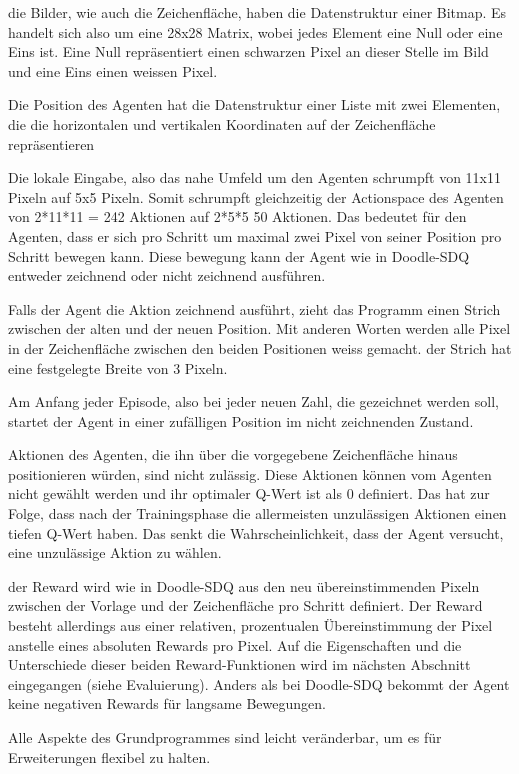 die Bilder, wie auch die Zeichenfläche, haben die Datenstruktur einer Bitmap. Es
handelt sich also um eine 28x28 Matrix, wobei jedes Element eine Null oder eine
Eins ist. Eine Null repräsentiert einen schwarzen Pixel an dieser Stelle im Bild
und eine Eins einen weissen Pixel.

Die Position des Agenten hat die Datenstruktur einer Liste mit zwei Elementen,
die die horizontalen und vertikalen Koordinaten auf der Zeichenfläche
repräsentieren

Die lokale Eingabe, also das nahe Umfeld um den Agenten schrumpft von 11x11
Pixeln auf 5x5 Pixeln. Somit schrumpft gleichzeitig der Actionspace des Agenten
von 2*11*11 = 242 Aktionen auf 2*5*5 50 Aktionen. Das bedeutet für den Agenten,
dass er sich pro Schritt um maximal zwei Pixel von seiner Position pro Schritt
bewegen kann. Diese bewegung kann der Agent wie in Doodle-SDQ entweder
zeichnend oder nicht zeichnend ausführen.

Falls der Agent die Aktion zeichnend ausführt, zieht das Programm einen Strich
zwischen der alten und der neuen Position. Mit anderen Worten werden alle Pixel
in der Zeichenfläche zwischen den beiden Positionen weiss gemacht. der Strich
hat eine festgelegte Breite von 3 Pixeln.

Am Anfang jeder Episode, also bei jeder neuen Zahl, die gezeichnet werden soll,
startet der Agent in einer zufälligen Position im nicht zeichnenden Zustand.

Aktionen des Agenten, die ihn über die vorgegebene Zeichenfläche hinaus
positionieren würden, sind nicht zulässig. Diese Aktionen können vom Agenten
nicht gewählt werden und ihr optimaler Q-Wert ist als 0 definiert. Das hat zur
Folge, dass nach der Trainingsphase die allermeisten unzulässigen Aktionen einen
tiefen Q-Wert haben. Das senkt die Wahrscheinlichkeit, dass der Agent versucht,
eine unzulässige Aktion zu wählen.

der Reward wird wie in Doodle-SDQ aus den neu übereinstimmenden Pixeln zwischen
der Vorlage und der Zeichenfläche pro Schritt definiert. Der Reward besteht
allerdings aus einer relativen, prozentualen Übereinstimmung der Pixel anstelle
eines absoluten Rewards pro Pixel. Auf die Eigenschaften und die Unterschiede
dieser beiden Reward-Funktionen wird im nächsten Abschnitt eingegangen (siehe
Evaluierung). Anders als bei Doodle-SDQ bekommt der Agent keine negativen
Rewards für langsame Bewegungen. 

Alle Aspekte des Grundprogrammes sind leicht veränderbar, um es für
Erweiterungen flexibel zu halten.


